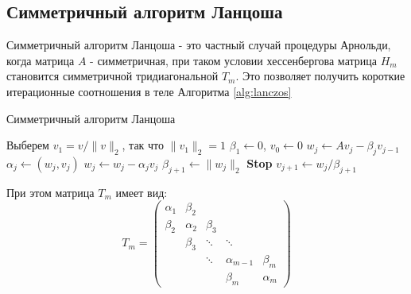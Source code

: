 \subsection{Симметричный алгоритм Ланцоша}
Симметричный алгоритм Ланцоша - это частный случай процедуры Арнольди, когда матрица 
$A$ - симметричная, при таком условии хессенбергова матрица $H_m$ становится симметричной
тридиагональной $T_m$. Это позволяет получить короткие итерационные соотношения в теле Алгоритма \ref{alg:lanczos} 
\begin{algorithm}
    \caption{Симметричный алгоритм Ланцоша}\label{alg:lanczos}
    \begin{algorithmic}[1]
    \State Выберем $v_1 = v / \|v\|_2$, так что $\|v_1\|_2 = 1$
    \State $\beta_1 \gets 0$, $v_0 \gets 0$
        \State $w_j \gets Av_j - \beta_j v_{j-1}$
        \State $\alpha_j \gets (w_j, v_j)$
        \State $w_j \gets w_j - \alpha_j v_j$
        \State $\beta_{j+1} \gets \|w_j\|_2$
            \State \textbf{Stop}
        \EndIf
        \State $v_{j+1} \gets w_j / \beta_{j+1}$
    \EndFor
    \end{algorithmic}
    \end{algorithm} 

При этом матрица $T_m$ имеет вид: 
\begin{equation}
T_m = \begin{pmatrix}
\alpha_1 & \beta_2 & & & \\
\beta_2 & \alpha_2 & \beta_3 & & \\
& \beta_3 & \ddots & \ddots & \\
& & \ddots & \alpha_{m-1} & \beta_m \\
& & & \beta_m & \alpha_m
\end{pmatrix}
\label{eq:T_m}
\end{equation}


